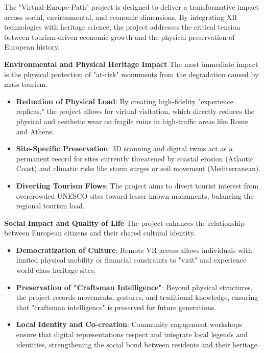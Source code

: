 The "Virtual-Europe-Path" project is designed to deliver a transformative impact across social, environmental, and economic dimensions. By integrating XR technologies with heritage science, the project addresses the critical tension between tourism-driven economic growth and the physical preservation of European history.

\textbf{Environmental and Physical Heritage Impact}
The most immediate impact is the physical protection of "at-risk" monuments from the degradation caused by mass tourism.
\begin{itemize}
    \item \textbf{Reduction of Physical Load}: By creating high-fidelity "experience replicas," the project allows for virtual visitation, which directly reduces the physical and aesthetic wear on fragile ruins in high-traffic areas like Rome and Athens.
    \item \textbf{Site-Specific Preservation}: 3D scanning and digital twins act as a permanent record for sites currently threatened by coastal erosion (Atlantic Coast) and climatic risks like storm surges or soil movement (Mediterranean).
    \item \textbf{Diverting Tourism Flows}: The project aims to divert tourist interest from overcrowded UNESCO sites toward lesser-known monuments, balancing the regional tourism load.
\end{itemize}

\textbf{Social Impact and Quality of Life}
The project enhances the relationship between European citizens and their shared cultural identity.
\begin{itemize}
    \item \textbf{Democratization of Culture}: Remote VR access allows individuals with limited physical mobility or financial constraints to "visit" and experience world-class heritage sites.
    \item \textbf{Preservation of "Craftsman Intelligence"}: Beyond physical structures, the project records movements, gestures, and traditional knowledge, ensuring that "craftsman intelligence" is preserved for future generations.
    \item \textbf{Local Identity and Co-creation}: Community engagement workshops ensure that digital representations respect and integrate local legends and identities, strengthening the social bond between residents and their heritage.
\end{itemize}


